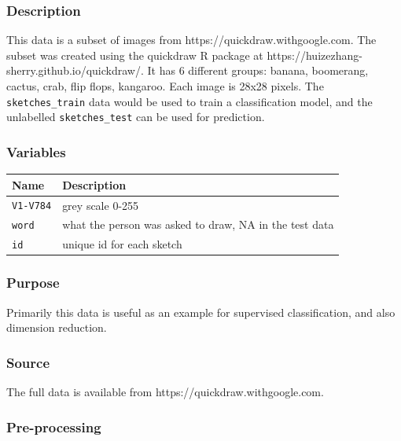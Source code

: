 \documentclass[
  letterpaper,
]{krantz}
\newcounter{none} %
\begin{document}
\subsubsection*{Description}\label{description-5}

This data is a subset of images from https://quickdraw.withgoogle.com.
The subset was created using the quickdraw R package at
https://huizezhang-sherry.github.io/quickdraw/. It has 6 different
groups: banana, boomerang, cactus, crab, flip flops, kangaroo. Each
image is 28x28 pixels. The \texttt{sketches\_train} data would be used
to train a classification model, and the unlabelled
\texttt{sketches\_test} can be used for prediction.

\subsubsection*{Variables}\label{variables-5}

{\def\LTcaptype{none} %
\begin{longtable}[]{@{}ll@{}}
\toprule\noalign{}
Name & Description \\
\midrule\noalign{}
\endhead
\bottomrule\noalign{}
\endlastfoot
\texttt{V1-V784} & grey scale 0-255 \\
\texttt{word} & what the person was asked to draw, NA in the test
data \\
\texttt{id} & unique id for each sketch \\
\end{longtable}
}

\subsubsection*{Purpose}\label{purpose-5}

Primarily this data is useful as an example for supervised
classification, and also dimension reduction.

\subsubsection*{Source}\label{source-5}

The full data is available from https://quickdraw.withgoogle.com.

\subsubsection*{Pre-processing}\label{pre-processing-5}
\end{document}
